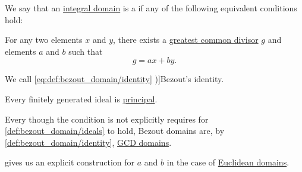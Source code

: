 \begin{definition}\label{def:bezout_domain}
  We say that an \hyperref[def:integral_domain]{integral domain} is a  if any of the following equivalent conditions hold:
  \begin{thmenum}
     For any two elements \( x \) and \( y \), there exists a \hyperref[def:gcd]{greatest common divisor} \( g \) and elements \( a \) and \( b \) such that
    \begin{equation}\label{eq:def:bezout_domain/identity}
      g = ax + by.
    \end{equation}

    We call \eqref{eq:def:bezout_domain/identity} \term[en=Bezout's identity (\cite[3]{Knapp2016BasicAlgebra})]{Bezout's identity}.

     Every finitely generated ideal is \hyperref[def:semiring_ideal/principal]{principal}.
  \end{thmenum}
\end{definition}
\begin{comments}
  \item Every though the condition is not explicitly requires for \cref{def:bezout_domain/ideals} to hold, Bezout domains are, by \cref{def:bezout_domain/identity}, \hyperref[def:gcd_domain]{GCD domains}.
  \item {} gives us an explicit construction for \( a \) and \( b \) in the case of \hyperref[def:euclidean_domain]{Euclidean domains}.
\end{comments}
